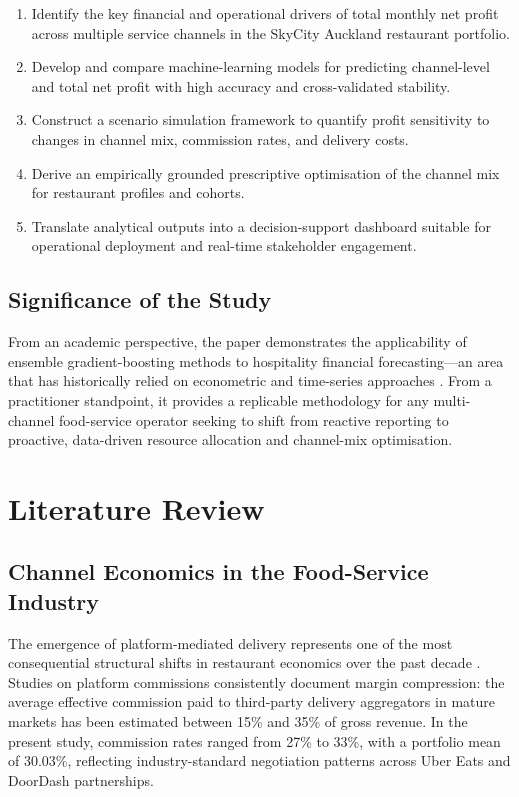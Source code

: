 \documentclass[10pt,a4paper,twocolumn]{article}
\begin{document}
\begin{enumerate}[leftmargin=*, label=\textbf{RO\arabic*.}, itemsep=1pt]
  \item Identify the key financial and operational drivers of total monthly net profit
        across multiple service channels in the SkyCity Auckland restaurant portfolio.
  \item Develop and compare machine-learning models for predicting channel-level and
        total net profit with high accuracy and cross-validated stability.
  \item Construct a scenario simulation framework to quantify profit sensitivity to
        changes in channel mix, commission rates, and delivery costs.
  \item Derive an empirically grounded prescriptive optimisation of the channel mix
        for restaurant profiles and cohorts.
  \item Translate analytical outputs into a decision-support dashboard suitable for
        operational deployment and real-time stakeholder engagement.
\end{enumerate}

\subsection{Significance of the Study}

From an academic perspective, the paper demonstrates the applicability of ensemble
gradient-boosting methods to hospitality financial forecasting—an area that has
historically relied on econometric and time-series approaches \citep{zhong2020forecasting}.
From a practitioner standpoint, it provides a replicable methodology for any
multi-channel food-service operator seeking to shift from reactive reporting to
proactive, data-driven resource allocation and channel-mix optimisation.

\section{Literature Review}
\label{sec:lit_review}

\subsection{Channel Economics in the Food-Service Industry}

The emergence of platform-mediated delivery represents one of the most consequential
structural shifts in restaurant economics over the past decade \citep{breidbach2020platform}.
Studies on platform commissions consistently document margin compression: the average
effective commission paid to third-party delivery aggregators in mature markets has been
estimated between 15\% and 35\% of gross revenue. In the present study, commission rates
ranged from 27\% to 33\%, with a portfolio mean of 30.03\%, reflecting industry-standard
negotiation patterns across Uber Eats and DoorDash partnerships.
\end{document}

